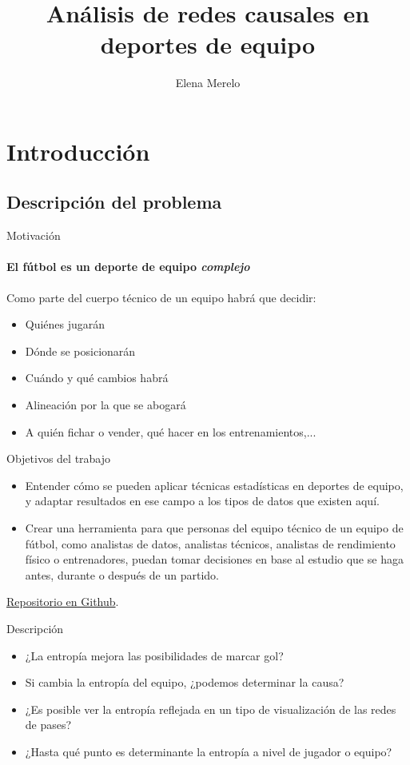 \documentclass{beamer}
\title[Análisis de redes causales en deportes de equipo]{Análisis de redes causales en deportes de equipo}
\author[E. Merelo]{Elena Merelo}
\begin{document}
	\typesetFrontSlides


\section{Introducción}

\subsection[Problema]{Descripción del problema}

\begin{frame}{Motivación}
	\framesubtitle{El fútbol es un deporte de equipo \textit{complejo}}
    Como parte del cuerpo técnico de un equipo habrá que decidir:
    \begin{itemize}
		\item Quiénes jugarán
		\pause
		\item Dónde se posicionarán
		\pause
        \item Cuándo y qué cambios habrá
		\pause
        \item Alineación por la que se abogará
        \pause
        \item A quién fichar o vender, qué hacer en los entrenamientos,... 
	\end{itemize}
\end{frame}

\begin{frame}{Objetivos del trabajo}
	\begin{itemize}
		\item <1->Entender cómo se pueden aplicar técnicas estadísticas en deportes de equipo, 
        y adaptar resultados en ese campo a los tipos de datos que existen aquí.
		\item <2->Crear una herramienta para que personas del equipo técnico de un equipo
        de fútbol, como analistas de datos, analistas técnicos, analistas de rendimiento físico o 
        entrenadores, puedan tomar decisiones en base al estudio que se haga antes, durante o después de 
        un partido.
	\end{itemize}
    \href{https://bit.ly/memoriaTFG_emerelo}{Repositorio en Github}.
\end{frame}

\begin{frame}{Descripción}
	\begin{itemize}
		\item <1->¿La entropía mejora las posibilidades de marcar gol? 
        \item <2->Si cambia la entropía del equipo, ¿podemos determinar la causa?
        \item <3->¿Es posible ver la entropía reflejada en un tipo de visualización de las redes de pases?
        \item <4->¿Hasta qué punto es determinante la entropía a nivel de jugador o equipo?
	\end{itemize}
\end{frame}
\end{document}
